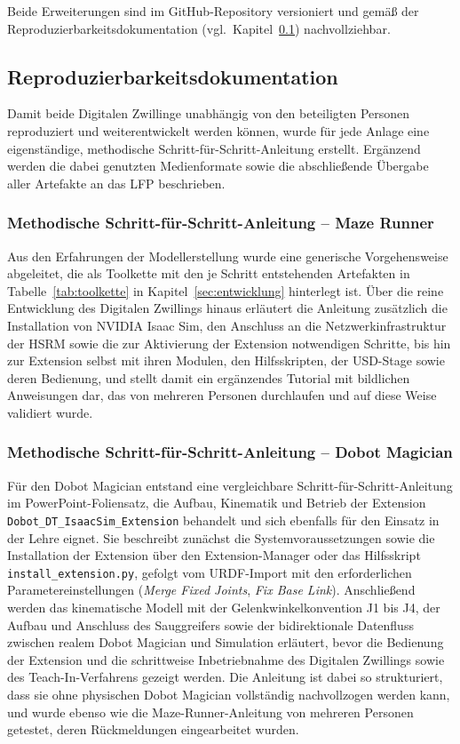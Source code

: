 Beide Erweiterungen sind im GitHub-Repository versioniert und gemäß der Reproduzierbarkeitsdokumentation (vgl.\ Kapitel~\ref{subsec:reprodoku}) nachvollziehbar.

\subsection{Reproduzierbarkeitsdokumentation}
\label{subsec:reprodoku}

Damit beide Digitalen Zwillinge unabhängig von den beteiligten Personen reproduziert und weiterentwickelt werden können, wurde für jede Anlage eine eigenständige, methodische Schritt-für-Schritt-Anleitung erstellt. Ergänzend werden die dabei genutzten Medienformate sowie die abschließende Übergabe aller Artefakte an das LFP beschrieben.

\subsubsection{Methodische Schritt-für-Schritt-Anleitung -- Maze Runner}
Aus den Erfahrungen der Modellerstellung wurde eine generische Vorgehensweise abgeleitet, die als Toolkette mit den je Schritt entstehenden Artefakten in Tabelle~\ref{tab:toolkette} in Kapitel~\ref{sec:entwicklung} hinterlegt ist.
Über die reine Entwicklung des Digitalen Zwillings hinaus erläutert die Anleitung zusätzlich die Installation von NVIDIA Isaac Sim, den Anschluss an die Netzwerkinfrastruktur der HSRM sowie die zur Aktivierung der Extension notwendigen Schritte, bis hin zur Extension selbst mit ihren Modulen, den Hilfsskripten, der USD-Stage sowie deren Bedienung, und stellt damit ein ergänzendes Tutorial mit bildlichen Anweisungen dar, das von mehreren Personen durchlaufen und auf diese Weise validiert wurde.

\subsubsection{Methodische Schritt-für-Schritt-Anleitung -- Dobot Magician}
Für den Dobot Magician entstand eine vergleichbare Schritt-für-Schritt-Anleitung im PowerPoint-Foliensatz, die Aufbau, Kinematik und Betrieb der Extension \texttt{Dobot\_\allowbreak DT\_\allowbreak IsaacSim\_\allowbreak Extension} behandelt und sich ebenfalls für den Einsatz in der Lehre eignet.
Sie beschreibt zunächst die Systemvoraussetzungen sowie die Installation der Extension über den Extension-Manager oder das Hilfsskript \texttt{install\_extension.py}, gefolgt vom URDF-Import mit den erforderlichen Parametereinstellungen (\emph{Merge Fixed Joints}, \emph{Fix Base Link}).
Anschließend werden das kinematische Modell mit der Gelenkwinkelkonvention J1 bis J4, der Aufbau und Anschluss des Sauggreifers sowie der bidirektionale Datenfluss zwischen realem Dobot Magician und Simulation erläutert, bevor die Bedienung der Extension und die schrittweise Inbetriebnahme des Digitalen Zwillings sowie des Teach-In-Verfahrens gezeigt werden.
Die Anleitung ist dabei so strukturiert, dass sie ohne physischen Dobot Magician vollständig nachvollzogen werden kann, und wurde ebenso wie die Maze-Runner-Anleitung von mehreren Personen getestet, deren Rückmeldungen eingearbeitet wurden.

